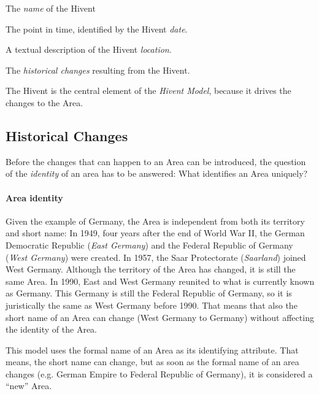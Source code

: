 \begin{compactenum}
  \item The \emph{name} of the Hivent
  \item The point in time, identified by the Hivent \emph{date}.
  \item A textual description of the Hivent \emph{location}.
  \item The \emph{historical changes} resulting from the Hivent.
\end{compactenum}

The Hivent is the central element of the \emph{Hivent Model}, because it drives the changes to the Area.


\subsection{Historical Changes} %
\label{sub:historical_changes}

Before the changes that can happen to an Area can be introduced, the question of the \emph{identity} of an area has to be answered: What identifies an Area uniquely?

\paragraph{Area identity} %
\label{par:area_identity}

Given the example of Germany, the Area is independent from both its territory and short name: In 1949, four years after the end of World War II, the German Democratic Republic (\emph{East Germany}) and the Federal Republic of Germany (\emph{West Germany}) were created. In 1957, the Saar Protectorate (\emph{Saarland}) joined West Germany. Although the territory of the Area has changed, it is still the same Area. In 1990, East and West Germany reunited to what is currently known as Germany. This Germany is still the Federal Republic of Germany, so it is juristically the same as West Germany before 1990. That means that also the short name of an Area can change (West Germany to Germany) without affecting the identity of the Area.

This model uses the formal name of an Area as its identifying attribute. That means, the short name can change, but as soon as the formal name of an area changes (e.g. German Empire to Federal Republic of Germany), it is considered a ``new'' Area.

